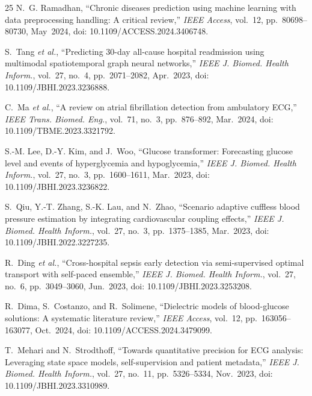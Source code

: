 \documentclass[conference]{IEEEtran}
\begin{document}
\begin{thebibliography}{25}
N.~G. Ramadhan, ``Chronic diseases prediction using machine learning with data preprocessing handling: A critical review,'' \textit{IEEE Access}, vol.~12, pp.~80698--80730, May~2024, doi: 10.1109/ACCESS.2024.3406748.

S.~Tang \textit{et al.}, ``Predicting 30-day all-cause hospital readmission using multimodal spatiotemporal graph neural networks,'' \textit{IEEE J. Biomed. Health Inform.}, vol.~27, no.~4, pp.~2071--2082, Apr.~2023, doi: 10.1109/JBHI.2023.3236888.

C.~Ma \textit{et al.}, ``A review on atrial fibrillation detection from ambulatory ECG,'' \textit{IEEE Trans. Biomed. Eng.}, vol.~71, no.~3, pp.~876--892, Mar.~2024, doi: 10.1109/TBME.2023.3321792.

S.-M. Lee, D.-Y. Kim, and J.~Woo, ``Glucose transformer: Forecasting glucose level and events of hyperglycemia and hypoglycemia,'' \textit{IEEE J. Biomed. Health Inform.}, vol.~27, no.~3, pp.~1600--1611, Mar.~2023, doi: 10.1109/JBHI.2023.3236822.

S.~Qiu, Y.-T. Zhang, S.-K. Lau, and N.~Zhao, ``Scenario adaptive cuffless blood pressure estimation by integrating cardiovascular coupling effects,'' \textit{IEEE J. Biomed. Health Inform.}, vol.~27, no.~3, pp.~1375--1385, Mar.~2023, doi: 10.1109/JBHI.2022.3227235.

R.~Ding \textit{et al.}, ``Cross-hospital sepsis early detection via semi-supervised optimal transport with self-paced ensemble,'' \textit{IEEE J. Biomed. Health Inform.}, vol.~27, no.~6, pp.~3049--3060, Jun.~2023, doi: 10.1109/JBHI.2023.3253208.

R.~Dima, S.~Costanzo, and R.~Solimene, ``Dielectric models of blood-glucose solutions: A systematic literature review,'' \textit{IEEE Access}, vol.~12, pp.~163056--163077, Oct.~2024, doi: 10.1109/ACCESS.2024.3479099.

T.~Mehari and N.~Strodthoff, ``Towards quantitative precision for ECG analysis: Leveraging state space models, self-supervision and patient metadata,'' \textit{IEEE J. Biomed. Health Inform.}, vol.~27, no.~11, pp.~5326--5334, Nov.~2023, doi: 10.1109/JBHI.2023.3310989.

\end{thebibliography}
\end{document}
